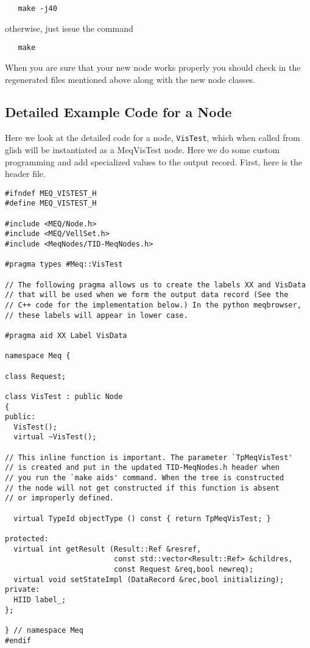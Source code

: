 \documentclass[10pt]{article}
\begin{document}
\begin{verbatim}
   make -j40 
\end{verbatim}

otherwise, just issue the command

\begin{verbatim}
   make
\end{verbatim}

When you are sure that your new node works properly you should check in 
the regenerated files mentioned above along with the new node classes.

\subsection {Detailed Example Code for a Node}

Here we look at the detailed code for a node, {\tt VisTest}, 
which when called from
glish will be instantiated as a MeqVisTest node. Here we do some custom
programming and add specialized values to the output record. First, here
is the header file.

\begin{verbatim}
#ifndef MEQ_VISTEST_H
#define MEQ_VISTEST_H
    
#include <MEQ/Node.h>
#include <MEQ/VellSet.h>
#include <MeqNodes/TID-MeqNodes.h>

#pragma types #Meq::VisTest

// The following pragma allows us to create the labels XX and VisData
// that will be used when we form the output data record (See the
// C++ code for the implementation below.) In the python meqbrowser, 
// these labels will appear in lower case.

#pragma aid XX Label VisData

namespace Meq {

class Request;

class VisTest : public Node
{
public:
  VisTest();
  virtual ~VisTest();

// This inline function is important. The parameter `TpMeqVisTest'
// is created and put in the updated TID-MeqNodes.h header when
// you run the `make aids' command. When the tree is constructed
// the node will not get constructed if this function is absent
// or improperly defined.

  virtual TypeId objectType () const { return TpMeqVisTest; }

protected:
  virtual int getResult (Result::Ref &resref, 
                         const std::vector<Result::Ref> &childres,
                         const Request &req,bool newreq);
  virtual void setStateImpl (DataRecord &rec,bool initializing);
private:
  HIID label_;
};

} // namespace Meq
#endif
\end{verbatim}
\end{document}
